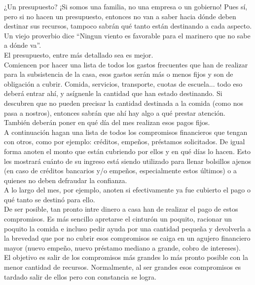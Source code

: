 \documentclass[12pt]{book} %
\begin{document}
¿Un presupuesto? ¡Si somos una familia, no una empresa o un gobierno! Pues sí, pero si no hacen un presupuesto, entonces no van a saber hacia dónde deben destinar sus recursos, tampoco sabrán qué tanto están destinando a cada aspecto. Un viejo proverbio dice ``Ningun viento es favorable para el marinero que no sabe a dónde va''.\\

El presupuesto, entre más detallado sea es mejor.\\

Comiencen por hacer una lista de todos los gastos frecuentes que han de realizar para la subsistencia de la casa, esos gastos serán más o menos fijos y son de obligación a cubrir. Comida, servicios, transporte, cuotas de escuela... todo eso deberá entrar ahí, y asígnenle la cantidad que han estado destinando. Si descubren que no pueden precisar la cantidad destinada a la comida (como nos pasa a nostros), entonces sabrán que ahí hay algo a qué prestar atención. También deberán poner en qué día del mes realizan esos pagos fijos.\\

A continuación hagan una lista de todos los compromisos financieros que tengan con otros, como por ejemplo: créditos, empeños, préstamos solicitados. De igual forma anoten el monto que están cubriendo por ellos y en qué días lo hacen. Esto les mostrará cuánto de su ingreso está siendo utilizado para llenar bolsillos ajenos (en caso de créditos bancarios y/o empeños, especialmente estos últimos) o a quienes no deben defraudar la confianza.\\

A lo largo del mes, por ejemplo, anoten si efectivamente ya fue cubierto el pago o qué tanto se destinó para ello.\\

De ser posible, tan pronto intre dinero a casa han de realizar el pago de estos compromisos. Es más sencillo apretarse el cinturón un poquito, racionar un poquito la comida e incluso pedir ayuda por una cantidad pequeña y devolverla a la brevedad que por no cubrir esos compromisos se caiga en un agujero financiero mayor (nuevo empeño, nuevo préstamo mediano a grande, cobro de intereses).\\

El objetivo es salir de los compromisos más grandes lo más pronto posible con la menor cantidad de recursos. Normalmente, al ser grandes esos compromisos es tardado salir de ellos pero con constancia se logra.
\end{document}
